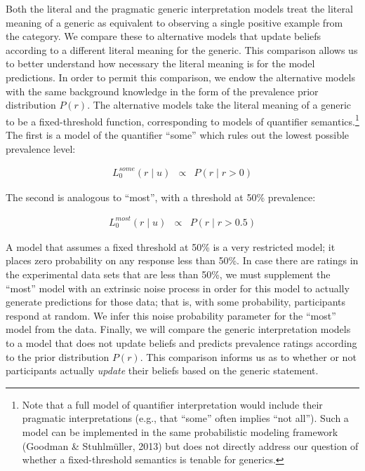 \documentclass[floatsintext,doc]{apa6}
\let\rmarkdownfootnote\footnote%
\def\footnote{\protect\rmarkdownfootnote}
\begin{document}
Both the literal and the pragmatic generic interpretation models treat the literal meaning of a generic as equivalent to observing a single positive example from the category.
We compare these to alternative models that update beliefs according to a different literal meaning for the generic.
This comparison allows us to better understand how necessary the literal meaning is for the model predictions.
In order to permit this comparison, we endow the alternative models with the same background knowledge in the form of the prevalence prior distribution \(P(r)\).
The alternative models take the literal meaning of a generic to be a fixed-threshold function, corresponding to models of quantifier semantics.\footnote{Note that a full model of quantifier interpretation would include their pragmatic interpretations (e.g., that \enquote{some} often implies \enquote{not all}). Such a model can be implemented in the same probabilistic modeling framework (Goodman \& Stuhlmüller, 2013) but does not directly address our question of whether a fixed-threshold semantics is tenable for generics.}
The first is a model of the quantifier \enquote{some} which rules out the lowest possible prevalence level:

\begin{eqnarray}
L_0^{some}(r \mid u) &\propto&  P(r \mid r > 0)  \label{eq:someModel}
\end{eqnarray}

The second is analogous to \enquote{most}, with a threshold at 50\% prevalence:

\begin{eqnarray}
L_0^{most}(r \mid u) &\propto&  P(r \mid r > 0.5)  \label{eq:mostModel}
\end{eqnarray}

A model that assumes a fixed threshold at 50\% is a very restricted model; it places zero probability on any response less than 50\%.
In case there are ratings in the experimental data sets that are less than 50\%, we must supplement the \enquote{most} model with an extrinsic noise process in order for this model to actually generate predictions for those data; that is, with some probability, participants respond at random.
We infer this noise probability parameter for the \enquote{most} model from the data.
Finally, we will compare the generic interpretation models to a model that does not update beliefs and predicts prevalence ratings according to the prior distribution \(P(r)\).
This comparison informs us as to whether or not participants actually \emph{update} their beliefs based on the generic statement.
\end{document}
